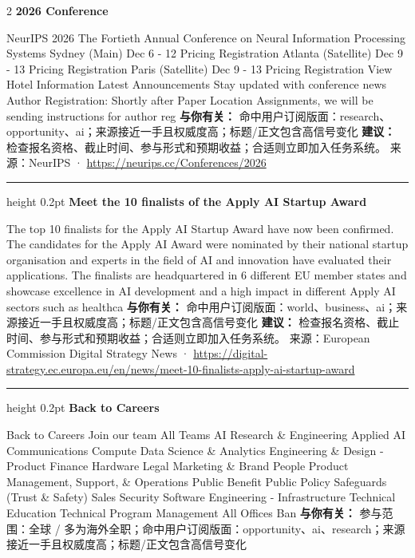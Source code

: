 \documentclass[10.5pt]{ctexart}
\begin{document}
\begin{multicols}{2}
{\large\bfseries 2026 Conference}\par
NeurIPS 2026 The Fortieth Annual Conference on Neural Information Processing Systems Sydney (Main) Dec 6 - 12 Pricing Registration Atlanta (Satellite) Dec 9 - 13 Pricing Registration Paris (Satellite) Dec 9 - 13 Pricing Registration View Hotel Information Latest Announcements Stay updated with conference news Author Registration: Shortly after Paper Location Assignments, we will be sending instructions for author reg
\textbf{与你有关：} 命中用户订阅版面：research、opportunity、ai；来源接近一手且权威度高；标题/正文包含高信号变化
\textbf{建议：} 检查报名资格、截止时间、参与形式和预期收益；合适则立即加入任务系统。
{\footnotesize\color{ormuted} 来源：NeurIPS · \url{https://neurips.cc/Conferences/2026}}
\vspace{2mm}
\hrule height 0.2pt
\vspace{2mm}
{\large\bfseries Meet the 10 finalists of the Apply AI Startup Award}\par
The top 10 finalists for the Apply AI Startup Award have now been confirmed. The candidates for the Apply AI Award were nominated by their national startup organisation and experts in the field of AI and innovation have evaluated their applications. The finalists are headquartered in 6 different EU member states and showcase excellence in AI development and a high impact in different Apply AI sectors such as healthca
\textbf{与你有关：} 命中用户订阅版面：world、business、ai；来源接近一手且权威度高；标题/正文包含高信号变化
\textbf{建议：} 检查报名资格、截止时间、参与形式和预期收益；合适则立即加入任务系统。
{\footnotesize\color{ormuted} 来源：European Commission Digital Strategy News · \url{https://digital-strategy.ec.europa.eu/en/news/meet-10-finalists-apply-ai-startup-award}}
\vspace{2mm}
\hrule height 0.2pt
\vspace{2mm}
{\large\bfseries Back to Careers}\par
Back to Careers Join our team All Teams AI Research \& Engineering Applied AI Communications Compute Data Science \& Analytics Engineering \& Design - Product Finance Hardware Legal Marketing \& Brand People Product Management, Support, \& Operations Public Benefit Public Policy Safeguards (Trust \& Safety) Sales Security Software Engineering - Infrastructure Technical Education Technical Program Management All Offices Ban
\textbf{与你有关：} 参与范围：全球 / 多为海外全职；命中用户订阅版面：opportunity、ai、research；来源接近一手且权威度高；标题/正文包含高信号变化

\end{multicols}
\end{document}
